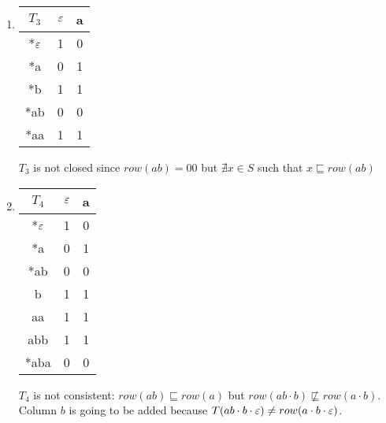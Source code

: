 \begin{enumerate}
  \item \begin{minipage}{0.3\textwidth}
          \begin{tabular}{c||c |c}
            $T_3$ & $\varepsilon$ & a \\
            \hline\hline
            *$\varepsilon$ & 1    & 0 \\
            *a    & 0    & 1 \\
            \hline\hline
            *b    & 1    & 1 \\
            *ab   & 0    & 0 \\
            *aa   & 1    & 1 \\
          \end{tabular}
        \end{minipage}\quad
        \begin{minipage}{0.6\textwidth}
          $T_3$ is not closed since $row(ab) = 00$ but $\nexists x \in S$ such that $x \sqsubseteq row(ab)$
        \end{minipage}

  \item \begin{minipage}{0.3\textwidth}
          \begin{tabular}{c||c |c}
            $T_4$ & $\varepsilon$ & a \\
            \hline\hline
            *$\varepsilon$ & 1    & 0 \\
            *a    & 0    & 1 \\
            *ab   & 0    & 0 \\
            \hline\hline
            b     & 1    & 1 \\
            aa    & 1    & 1 \\
            abb   & 1    & 1 \\
            *aba  & 0    & 0 \\
          \end{tabular}
        \end{minipage}\quad
        \begin{minipage}{0.6\textwidth}
          $T_4$ is not consistent: $row(ab) \sqsubseteq row(a)$ but $row(ab \cdot b) \not\sqsubseteq row(a \cdot b)$. Column $b$ is going to be added because $T(ab \cdot b \cdot \varepsilon) \neq row(a \cdot b \cdot \varepsilon)$.
        \end{minipage}


\end{enumerate}
